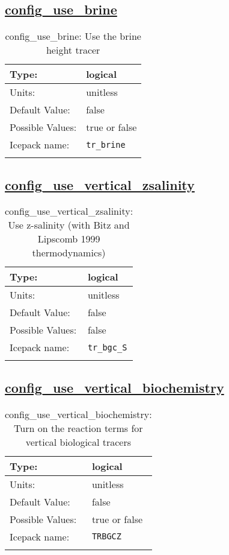 \subsection[config\_use\_brine]{\hyperref[sec:nm_tab_biogeochemistry]{config\_use\_brine}}
\label{subsec:nm_sec_config_use_brine}
\begin{center}
\begin{longtable}{| p{2.0in} || p{4.0in} |}
    \hline
    Type: & logical \\
    \hline
    Units: & \si{unitless} \\
    \hline
    Default Value: & false \\
    \hline
    Possible Values: & true or false \\
    \hline
    \hline
    Icepack name: & \verb+tr_brine+ \\
    \caption{config\_use\_brine: Use the brine height tracer}
\end{longtable}
\end{center}
\subsection[config\_use\_vertical\_zsalinity]{\hyperref[sec:nm_tab_biogeochemistry]{config\_use\_vertical\_zsalinity}}
\label{subsec:nm_sec_config_use_vertical_zsalinity}
\begin{center}
\begin{longtable}{| p{2.0in} || p{4.0in} |}
    \hline
    Type: & logical \\
    \hline
    Units: & \si{unitless} \\
    \hline
    Default Value: & false \\
    \hline
    Possible Values: & false \\
    \hline
    \hline
    Icepack name: & \verb+tr_bgc_S+ \\
    \caption{config\_use\_vertical\_zsalinity: Use z-salinity (with Bitz and Lipscomb 1999 thermodynamics)}
\end{longtable}
\end{center}
\subsection[config\_use\_vertical\_biochemistry]{\hyperref[sec:nm_tab_biogeochemistry]{config\_use\_vertical\_biochemistry}}
\label{subsec:nm_sec_config_use_vertical_biochemistry}
\begin{center}
\begin{longtable}{| p{2.0in} || p{4.0in} |}
    \hline
    Type: & logical \\
    \hline
    Units: & \si{unitless} \\
    \hline
    Default Value: & false \\
    \hline
    Possible Values: & true or false \\
    \hline
    \hline
    Icepack name: & \verb+TRBGCZ+ \\
    \caption{config\_use\_vertical\_biochemistry: Turn on the reaction terms for vertical biological tracers}
\end{longtable}
\end{center}
